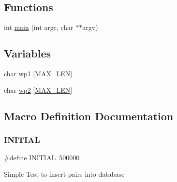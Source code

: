 \subsection*{Functions}
\begin{DoxyCompactItemize}
\item 
int \mbox{\hyperlink{adat-devel_2other__libs_2filedb_2filehash_2treplace_8c_a3c04138a5bfe5d72780bb7e82a18e627}{main}} (int argc, char $\ast$$\ast$argv)
\end{DoxyCompactItemize}
\subsection*{Variables}
\begin{DoxyCompactItemize}
\item 
char \mbox{\hyperlink{adat-devel_2other__libs_2filedb_2filehash_2treplace_8c_ae2b9e201e27e242b57e2ff99dff6d28a}{wp1}} \mbox{[}\mbox{\hyperlink{adat__devel_2other__libs_2filedb_2filehash_2twrite_8c_aabf4f709c8199e41cf279c77112345fe}{M\+A\+X\+\_\+\+L\+EN}}\mbox{]}
\item 
char \mbox{\hyperlink{adat-devel_2other__libs_2filedb_2filehash_2treplace_8c_a54ed4cc0c9df4a27e6b33a32e3c785cc}{wp2}} \mbox{[}\mbox{\hyperlink{adat__devel_2other__libs_2filedb_2filehash_2twrite_8c_aabf4f709c8199e41cf279c77112345fe}{M\+A\+X\+\_\+\+L\+EN}}\mbox{]}
\end{DoxyCompactItemize}


\subsection{Macro Definition Documentation}
\mbox{\label{adat-devel_2other__libs_2filedb_2filehash_2treplace_8c_aa3d063564f6ab16f6d408b8369d0e9ff}} 
\subsubsection{\texorpdfstring{INITIAL}{INITIAL}}
{\footnotesize\ttfamily \#define I\+N\+I\+T\+I\+AL~500000}

Simple Test to insert pairs into database \mbox{\label{adat-devel_2other__libs_2filedb_2filehash_2treplace_8c_aabf4f709c8199e41cf279c77112345fe}} 
